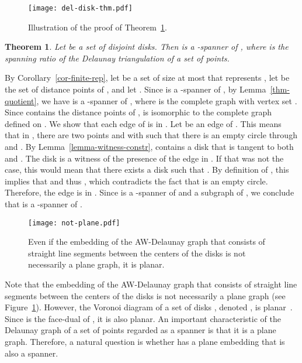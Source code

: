 \documentclass[pdftex,leqno,fleqn,12pt]{article}
\newtheorem{theorem}{Theorem}[section]
\newenvironment{proof}{{\textit Proof:} \rm}{\hfill  \medskip\\}
\begin{document}
\begin{figure}
\centering
\texttt{[image: del-disk-thm.pdf]}
\caption{Illustration of the proof of Theorem~\ref{thm-del-disks}.}
\end{figure}

\begin{theorem}\label{thm-del-disks} Let  be a set of  disjoint disks.
Then  is a -spanner of , where  is the spanning ratio of the
Delaunay triangulation of a set of points.
\end{theorem}
\begin{proof}
By Corollary~\ref{cor-finite-rep}, let  be a set of size at most  that represents
, let  be the set of distance points of , and let . Since
 is a -spanner of , by Lemma~\ref{thm-quotient}, we have  is a
-spanner of , where  is the complete graph with vertex set .
Since  contains the distance points of ,
 is isomorphic to the complete graph defined on . We show that each
edge  of  is in . Let  be an edge of
. This means that in , there are two points  and  with  such that there is an empty circle  through  and . By Lemma~\ref{lemma-witness-constr},
 contains a disk  that is tangent to both  and . The disk  is a witness of the
presence of the edge  in . If that was not the case, this would mean that
there exists a disk  such that . By definition of , this
implies that  and thus , which contradicts the fact
that  is an empty circle. Therefore, the edge  is in .
Since  is a -spanner of  and a subgraph of
, we conclude that  is a -spanner of .
\end{proof}



\begin{figure}
\centering\texttt{[image: not-plane.pdf]}\caption{Even if the embedding of the AW-Delaunay graph
that consists of straight line segments between the centers of the disks is not necessarily a plane
graph, it is planar.}\label{fig-not-plane}
\end{figure}


Note that the embedding of the AW-Delaunay graph that consists of straight line segments between
the centers of the disks is not necessarily a plane graph (see Figure~\ref{fig-not-plane}).
However, the Voronoi diagram of a set of disks , denoted , is
planar~\cite{okabe00}. Since  is the face-dual of , it is
also planar. An important characteristic of the Delaunay graph of a set of points regarded as a
spanner is that it is a plane graph. Therefore, a natural question is whether 
has a plane embedding that is also a spanner.
\end{document}
